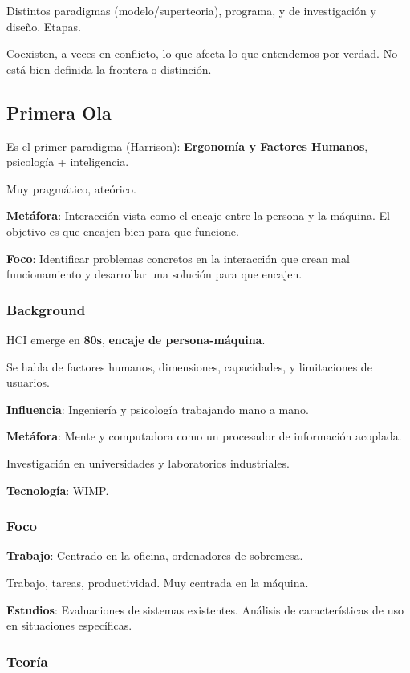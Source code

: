 \documentclass[12pt, twoside, openright]{report} %
\begin{document}
Distintos paradigmas (modelo/superteoria), programa, y de investigación
y diseño. Etapas.

Coexisten, a veces en conflicto, lo que afecta lo que entendemos por
verdad. No está bien definida la frontera o distinción.

\subsection{Primera Ola}

Es el primer paradigma (Harrison): \textbf{Ergonomía y Factores
	Humanos}, psicología + inteligencia.

Muy pragmático, ateórico.

\textbf{Metáfora}: Interacción vista como el encaje entre la persona y
la máquina. El objetivo es que encajen bien para que funcione.

\textbf{Foco}: Identificar problemas concretos en la interacción que
crean mal funcionamiento y desarrollar una solución para que encajen.

\subsubsection{Background}

HCI emerge en \textbf{80s}, \textbf{encaje de persona-máquina}.

Se habla de factores humanos, dimensiones, capacidades, y limitaciones
de usuarios.

\textbf{Influencia}: Ingeniería y psicología trabajando mano a mano.

\textbf{Metáfora}: Mente y computadora como un procesador de información
acoplada.

Investigación en universidades y laboratorios industriales.

\textbf{Tecnología}: WIMP.

\subsubsection{Foco}

\textbf{Trabajo}: Centrado en la oficina, ordenadores de sobremesa.

Trabajo, tareas, productividad. Muy centrada en la máquina.

\textbf{Estudios}: Evaluaciones de sistemas existentes. Análisis de
características de uso en situaciones específicas.

\subsubsection{Teoría}
\end{document}
